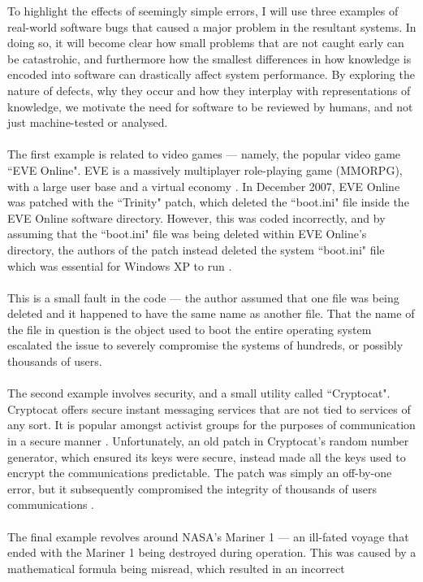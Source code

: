 To highlight the effects of seemingly simple errors, I will use three examples of real-world
software bugs that caused a major problem in the resultant systems.
In doing so, it will become clear how small problems that are not caught early can be catastrohic,
and furthermore how the smallest differences in how knowledge is encoded into software can
drastically affect system performance.
By exploring the nature of defects, why they occur and how they interplay with representations of
knowledge, we motivate the need for software to be reviewed by humans, and not just machine-tested
or analysed.\\
\\
The first example is related to video games --- namely, the popular video game ``EVE Online".
EVE is a massively multiplayer role-playing game (MMORPG), with a large user base and a virtual
economy \FIXME.
In December 2007, EVE Online was patched with the ``Trinity" patch, which deleted the ``boot.ini"
file inside the EVE Online software directory.
However, this was coded incorrectly, and by assuming that the ``boot.ini" file was being deleted
within EVE Online's directory, the authors of the patch instead deleted the system ``boot.ini" file
which was essential for Windows XP to run \FIXME.\\
\\
This is a small fault in the code --- the author assumed that one file was being deleted and it
happened to have the same name as another file.
That the name of the file in question is the object used to boot the entire operating system
escalated the issue to severely compromise the systems of hundreds, or possibly thousands of
users.\\
\\
The second example involves security, and a small utility called ``Cryptocat".
Cryptocat offers secure instant messaging services that are not tied to services of any sort.
It is popular amongst activist groups for the purposes of communication in a secure manner \FIXME.
Unfortunately, an old patch in Cryptocat's random number generator, which ensured its keys were
secure, instead made all the keys used to encrypt the communications predictable.
The patch was simply an off-by-one error, but it subsequently compromised the integrity of thousands
of users communications \FIXME.\\
\\
The final example revolves around NASA's Mariner 1 --- an ill-fated voyage that ended with the
Mariner 1 being destroyed during operation.
This was caused by a mathematical formula being misread, which resulted in an incorrect
